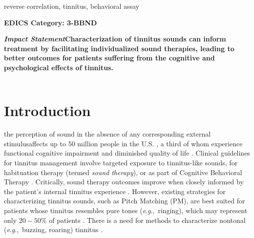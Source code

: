 \documentclass[journal]{IEEEtran}
\newcommand{\eg}{\textit{e}.\textit{g}.,\ }
\begin{document}
\begin{IEEEkeywords}
    reverse correlation, tinnitus, behavioral assay
\end{IEEEkeywords}

\ifCLASSOPTIONpeerreview
\begin{center} \bfseries EDICS Category: 3-BBND \end{center}
\fi
%
\IEEEpeerreviewmaketitle

\begin{minipage}[t]{0.9\columnwidth}
  \textbf{\textit{Impact Statement}\textemdash{}Characterization of tinnitus sounds can inform treatment by facilitating individualized sound therapies, leading to better outcomes for patients suffering from the cognitive and psychological effects of tinnitus.}\\
\\
\end{minipage}

\section{Introduction}
\textemdash{}the perception of sound
in the absence of any corresponding external stimulus\textemdash{}affects up to 50 million people in the U.S. \cite{bhattPrevalenceSeverityExposures2016},
a third of whom experience functional cognitive impairment and diminished quality of life
\cite{nondahlImpactTinnitusQuality2007,tegg-quinnImpactTinnitusCognition2016}.
Clinical guidelines for tinnitus management involve targeted exposure to tinnitus-like sounds, for habituation therapy (termed \textit{sound therapy}), or as part of Cognitive Behavioral Therapy \cite{tunkelClinicalPracticeGuideline2014}.
Critically, sound therapy outcomes improve when closely informed by the patient's internal tinnitus experience \cite{okamotoListeningTailormadeNotched2010,schaetteAcousticStimulationTreatments2010,steinInhibitioninducedPlasticityTinnitus2015}.
However, existing strategies for characterizing tinnitus sounds, such as Pitch Matching (PM), are best suited for patients whose tinnitus resembles pure tones (\eg ringing), which may represent only $20-50\%$ of patients \cite{henryAuditoryTestResult2009,ukaegbeTinnitusItsEffect2017}.
There is a need for methods to characterize nontonal (\eg buzzing, roaring) tinnitus \cite{henryMeasurementTinnitus2016,norenaPsychoacousticCharacterizationTinnitus2002}.
\end{document}
